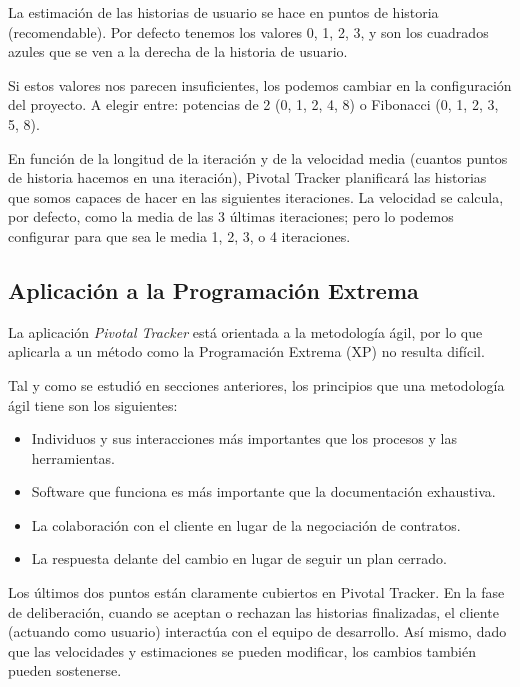       La estimación de las historias de usuario se hace en puntos de historia (recomendable). Por defecto tenemos los valores 0, 1, 2, 3, y son los cuadrados azules que se ven a la derecha de la historia de usuario.
      
      Si estos valores nos parecen insuficientes, los podemos cambiar en la configuración del proyecto. A elegir entre: potencias de 2 (0, 1, 2, 4, 8) o Fibonacci (0, 1, 2, 3, 5, 8).
      
      En función de la longitud de la iteración y de la velocidad media (cuantos puntos de historia hacemos en una iteración), Pivotal Tracker planificará las historias que somos capaces de hacer en las siguientes iteraciones. La velocidad se calcula, por defecto, como la media de las 3 últimas iteraciones; pero lo podemos configurar para que sea le media 1, 2, 3, o 4 iteraciones.
      
    
  
  \subsection{Aplicación a la Programación Extrema} %
    \label{sub:aplicacion_a_las_metodologias_agiles}
    
    La aplicación {\it Pivotal Tracker} está orientada a la metodología ágil, por lo que aplicarla a un método como la Programación Extrema (XP) no resulta difícil.

    Tal y como se estudió en secciones anteriores, los principios que una metodología ágil tiene son los siguientes:
      \begin{itemize}
        \item Individuos y sus interacciones más importantes que los procesos y las herramientas.
        \item Software que funciona es más importante que la documentación exhaustiva.
        \item La colaboración con el cliente en lugar de la negociación de contratos.
        \item La respuesta delante del cambio en lugar de seguir un plan cerrado.
      \end{itemize}

    Los últimos dos puntos están claramente cubiertos en Pivotal Tracker. En la fase de deliberación, cuando se aceptan o rechazan las historias finalizadas, el cliente (actuando como usuario) interactúa con el equipo de desarrollo. Así mismo, dado que las velocidades y estimaciones se pueden modificar, los cambios también pueden sostenerse.

